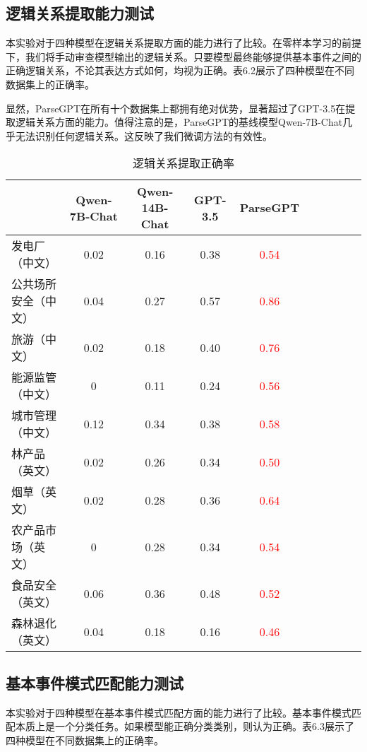 \subsection{逻辑关系提取能力测试}

本实验对于四种模型在逻辑关系提取方面的能力进行了比较。在零样本学习的前提下，我们将手动审查模型输出的逻辑关系。只要模型最终能够提供基本事件之间的正确逻辑关系，不论其表达方式如何，均视为正确。表6.2展示了四种模型在不同数据集上的正确率。

显然，ParseGPT在所有十个数据集上都拥有绝对优势，显著超过了GPT-3.5在提取逻辑关系方面的能力。值得注意的是，ParseGPT的基线模型Qwen-7B-Chat几乎无法识别任何逻辑关系。这反映了我们微调方法的有效性。

\begin{table*}[!t]
\centering
\caption{逻辑关系提取正确率}
\begin{tabular}{@{}lccccccccc@{}}
\toprule
& {Qwen-7B-Chat} & {Qwen-14B-Chat} & {GPT-3.5}  & {ParseGPT} \\
\midrule
发电厂（中文） & 0.02 & 0.16 & 0.38  & \textcolor{red}{0.54} \\
公共场所安全（中文） & 0.04 & 0.27 & 0.57  & \textcolor{red}{0.86} \\
旅游（中文） & 0.02 & 0.18 & 0.40  &\textcolor{red}{0.76} \\
能源监管（中文） & 0 & 0.11 & 0.24  & \textcolor{red}{0.56} \\
城市管理（中文） & 0.12 & 0.34 & 0.38  & \textcolor{red}{0.58} \\
林产品（英文） & 0.02  & 0.26  & 0.34  & \textcolor{red}{0.50}     \\
烟草（英文） & 0.02  & 0.28  & 0.36  & \textcolor{red}{0.64}    \\
农产品市场（英文） & 0  & 0.28  & 0.34  & \textcolor{red}{0.54}     \\
食品安全（英文） & 0.06  & 0.36  & 0.48  & \textcolor{red}{0.52}     \\
森林退化（英文） & 0.04  & 0.18  & 0.16  & \textcolor{red}{0.46}   \\
\bottomrule
\end{tabular}
\end{table*}

\subsection{基本事件模式匹配能力测试}

本实验对于四种模型在基本事件模式匹配方面的能力进行了比较。基本事件模式匹配本质上是一个分类任务。如果模型能正确分类类别，则认为正确。表6.3展示了四种模型在不同数据集上的正确率。


